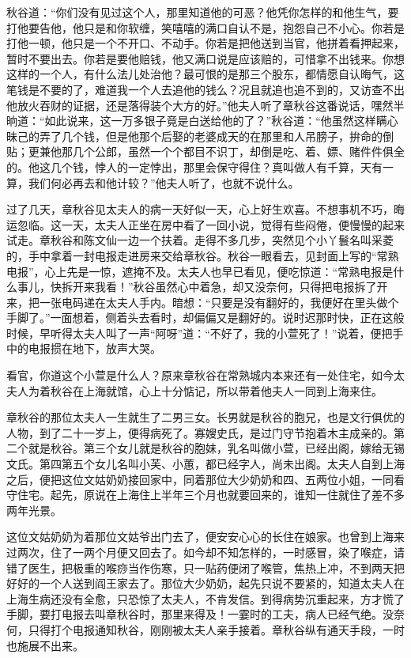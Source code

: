 \documentclass[12pt,UTF8]{ctexbook}
\begin{document}
{{{秋谷道：“你们没有见过这个人，那里知道他的可恶？他凭你怎样的和他生气，要打他要告他，他只是和你软缠，笑嘻嘻的满口自认不是，抱怨自己不小心。你若是打他一顿，他只是一个不开口、不动手。你若是把他送到当官，他拼着看押起来，暂时不要出去。你若是要他赔钱，他又满口说是应该赔的，可惜拿不出钱来。你想这样的一个人，有什么法儿处治他？最可恨的是那三个股东，都情愿自认晦气，这笔钱是不要的了，难道我一个人去追他的钱么？况且就追也追不到的，又访查不出他放火吞财的证据，还是落得装个大方的好。”他夫人听了章秋谷这番说话，嘿然半晌道：“如此说来，这一万多银子竟是白送给他的了？”秋谷道：“他虽然这样瞒心昧己的弄了几个钱，但是他那个后娶的老婆成天的在那里和人吊膀子，拚命的倒贴；更兼他那几个公郎，虽然一个个都目不识丁，却倒是吃、着、嫖、赌件件俱全的。他这几个钱，悖人的一定悖出，那里会保守得住？真叫做人有千算，天有一算，我们何必再去和他计较？”他夫人听了，也就不说什么。

过了几天，章秋谷见太夫人的病一天好似一天，心上好生欢喜。不想事机不巧，晦运忽临。这一天，太夫人正坐在房中看了一回小说，觉得有些闷倦，便慢慢的起来试走。章秋谷和陈文仙一边一个扶着。走得不多几步，突然见个小丫鬟名叫采菱的，手中拿着一封电报走进房来交给章秋谷。秋谷一眼看去，见封面上写的“常熟电报”，心上先是一惊，遮掩不及。太夫人也早已看见，便吃惊道：“常熟电报是什么事儿，快拆开来我看！”秋谷虽然心中着急，却又没奈何，只得把电报拆了开来，把一张电码递在太夫人手内。暗想：“只要是没有翻好的，我便好在里头做个手脚了。”一面想着，侧着头去看时，却偏偏又是翻好的。说时迟那时快，正在这般时候，早听得太夫人叫了一声“阿呀”道：“不好了，我的小萱死了！”说着，便把手中的电报掼在地下，放声大哭。

看官，你道这个小萱是什么人？原来章秋谷在常熟城内本来还有一处住宅，如今太夫人为着秋谷在上海就馆，心上十分惦记，所以带着他夫人一同到上海来住。

章秋谷的那位太夫人一生就生了二男三女。长男就是秋谷的胞兄，也是文行俱优的人物，到了二十一岁上，便得病死了。寡嫂史氏，是过门守节抱着木主成亲的。第二个就是秋谷。第三个女儿就是秋谷的胞妹，乳名叫做小萱，已经出阁，嫁给无锡文氏。第四第五个女儿名叫小芙、小蕙，都已经字人，尚未出阁。太夫人自到上海之后，便把这位文姑奶奶接回家中，同着那位大少奶奶和四、五两位小姐，一同看守住宅。起先，原说在上海住上半年三个月也就要回来的，谁知一住就住了差不多两年光景。

这位文姑奶奶为着那位文姑爷出门去了，便安安心心的长住在娘家。也曾到上海来过两次，住了一两个月便又回去了。如今却不知怎样的，一时感冒，染了喉症，请错了医生，把极重的喉痧当作伤寒，只一贴药便闭了喉管，焦热上冲，不到两天把好好的一个人送到阎王家去了。那位大少奶奶，起先只说不要紧的，知道太夫人在上海生病还没有全愈，只恐惊了太夫人，不肯发信。到得病势沉重起来，方才慌了手脚，要打电报去叫章秋谷时，那里来得及！一霎时的工夫，病人已经气绝。没奈何，只得打个电报通知秋谷，刚刚被太夫人亲手接着。章秋谷纵有通天手段，一时也施展不出来。

}}}
\end{document}
